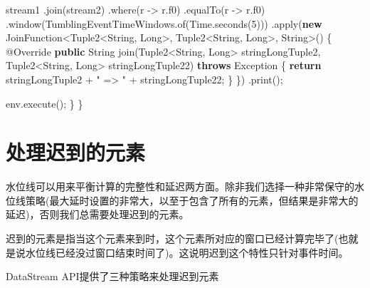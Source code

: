 \documentclass[cn,11pt,chinese]{elegantbook}
\newenvironment{Shaded}{}{}
\newcommand{\AttributeTok}[1]{\textcolor[rgb]{0.49,0.56,0.16}{#1}}
\newcommand{\BuiltInTok}[1]{#1}
\newcommand{\DecValTok}[1]{\textcolor[rgb]{0.25,0.63,0.44}{#1}}
\newcommand{\FunctionTok}[1]{\textcolor[rgb]{0.02,0.16,0.49}{#1}}
\newcommand{\KeywordTok}[1]{\textcolor[rgb]{0.00,0.44,0.13}{\textbf{#1}}}
\newcommand{\NormalTok}[1]{#1}
\newcommand{\StringTok}[1]{\textcolor[rgb]{0.25,0.44,0.63}{#1}}
\begin{document}
\begin{Shaded}
\begin{Highlighting}[]
\NormalTok{        stream1}
\NormalTok{            .}\FunctionTok{join}\NormalTok{(stream2)}
\NormalTok{            .}\FunctionTok{where}\NormalTok{(r {-}\textgreater{} r.}\FunctionTok{f0}\NormalTok{)}
\NormalTok{            .}\FunctionTok{equalTo}\NormalTok{(r {-}\textgreater{} r.}\FunctionTok{f0}\NormalTok{)}
\NormalTok{            .}\FunctionTok{window}\NormalTok{(TumblingEventTimeWindows.}\FunctionTok{of}\NormalTok{(}\BuiltInTok{Time}\NormalTok{.}\FunctionTok{seconds}\NormalTok{(}\DecValTok{5}\NormalTok{)))}
\NormalTok{            .}\FunctionTok{apply}\NormalTok{(}\KeywordTok{new}\NormalTok{ JoinFunction\textless{}Tuple2\textless{}}\BuiltInTok{String}\NormalTok{, }\BuiltInTok{Long}\NormalTok{\textgreater{}, Tuple2\textless{}}\BuiltInTok{String}\NormalTok{, }\BuiltInTok{Long}\NormalTok{\textgreater{}, }\BuiltInTok{String}\NormalTok{\textgreater{}() \{}
                \AttributeTok{@Override}
                \KeywordTok{public} \BuiltInTok{String} \FunctionTok{join}\NormalTok{(Tuple2\textless{}}\BuiltInTok{String}\NormalTok{, }\BuiltInTok{Long}\NormalTok{\textgreater{} stringLongTuple2, Tuple2\textless{}}\BuiltInTok{String}\NormalTok{, }\BuiltInTok{Long}\NormalTok{\textgreater{} stringLongTuple22) }\KeywordTok{throws} \BuiltInTok{Exception}\NormalTok{ \{}
                    \KeywordTok{return}\NormalTok{ stringLongTuple2 + }\StringTok{" =\textgreater{} "}\NormalTok{ + stringLongTuple22;}
\NormalTok{                \}}
\NormalTok{            \})}
\NormalTok{            .}\FunctionTok{print}\NormalTok{();}

\NormalTok{        env.}\FunctionTok{execute}\NormalTok{();}
\NormalTok{    \}}
\NormalTok{\}}
\end{Highlighting}
\end{Shaded}

\hypertarget{ux5904ux7406ux8fdfux5230ux7684ux5143ux7d20}{%
\section{处理迟到的元素}\label{ux5904ux7406ux8fdfux5230ux7684ux5143ux7d20}}

水位线可以用来平衡计算的完整性和延迟两方面。除非我们选择一种非常保守的水位线策略(最大延时设置的非常大，以至于包含了所有的元素，但结果是非常大的延迟)，否则我们总需要处理迟到的元素。

迟到的元素是指当这个元素来到时，这个元素所对应的窗口已经计算完毕了(也就是说水位线已经没过窗口结束时间了)。这说明迟到这个特性只针对事件时间。

DataStream API提供了三种策略来处理迟到元素
\end{document}
